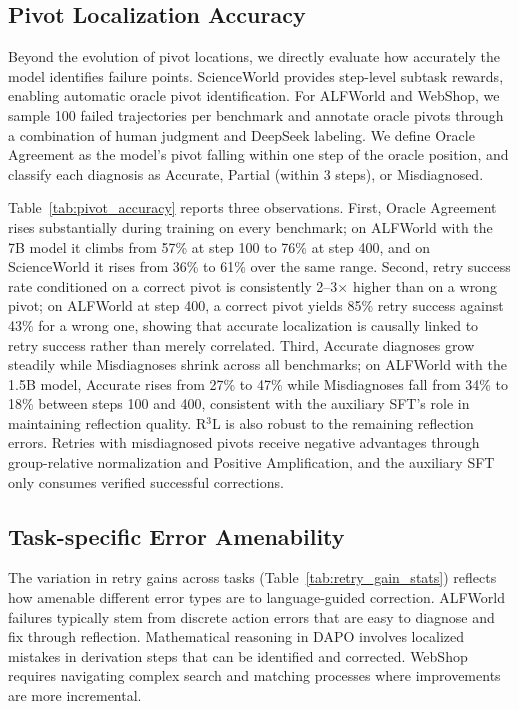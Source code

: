 \documentclass{article} %
\theoremstyle{definition}
\theoremstyle{remark}
\begin{document}
\subsection{Pivot Localization Accuracy}
\label{sec:pivot_accuracy}

Beyond the evolution of pivot locations, we directly evaluate how accurately the model identifies failure points. ScienceWorld provides step-level subtask rewards, enabling automatic oracle pivot identification. For ALFWorld and WebShop, we sample 100 failed trajectories per benchmark and annotate oracle pivots through a combination of human judgment and DeepSeek labeling. We define Oracle Agreement as the model's pivot falling within one step of the oracle position, and classify each diagnosis as Accurate, Partial (within 3 steps), or Misdiagnosed.



Table~\ref{tab:pivot_accuracy} reports three observations. First, Oracle Agreement rises substantially during training on every benchmark; on ALFWorld with the 7B model it climbs from 57\% at step 100 to 76\% at step 400, and on ScienceWorld it rises from 36\% to 61\% over the same range. Second, retry success rate conditioned on a correct pivot is consistently 2--3$\times$ higher than on a wrong pivot; on ALFWorld at step 400, a correct pivot yields 85\% retry success against 43\% for a wrong one, showing that accurate localization is causally linked to retry success rather than merely correlated. Third, Accurate diagnoses grow steadily while Misdiagnoses shrink across all benchmarks; on ALFWorld with the 1.5B model, Accurate rises from 27\% to 47\% while Misdiagnoses fall from 34\% to 18\% between steps 100 and 400, consistent with the auxiliary SFT's role in maintaining reflection quality. R$^3$L is also robust to the remaining reflection errors. Retries with misdiagnosed pivots receive negative advantages through group-relative normalization and Positive Amplification, and the auxiliary SFT only consumes verified successful corrections.

\subsection{Task-specific Error Amenability}
\label{sec:error_amenability}

The variation in retry gains across tasks (Table~\ref{tab:retry_gain_stats}) reflects how amenable different error types are to language-guided correction. ALFWorld failures typically stem from discrete action errors that are easy to diagnose and fix through reflection. Mathematical reasoning in DAPO involves localized mistakes in derivation steps that can be identified and corrected. WebShop requires navigating complex search and matching processes where improvements are more incremental.
\end{document}
